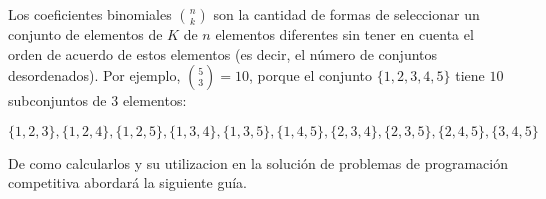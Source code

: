 Los coeficientes binomiales $ \binom n k $ son la cantidad de formas de seleccionar un conjunto de elementos de $ K $ de $ n $ elementos diferentes sin tener en cuenta el orden de acuerdo de estos elementos (es decir, el número de conjuntos desordenados). Por ejemplo, $ \binom 5 3   = 10$, porque el conjunto $\{1, 2, 3, 4, 5\}$ tiene $10$ subconjuntos de $3$ elementos:

$$\{1, 2, 3\}, \{1, 2, 4\}, \{1, 2, 5\}, \{1, 3, 4\}, \{1, 3, 5\}, \{1, 4, 5\}, \{2, 3, 4\}, \{2, 3, 5\}, \{2, 4, 5\}, \{3, 4, 5\} $$

De como calcularlos y su utilizacion en la solución de problemas de programación competitiva abordará la siguiente guía.